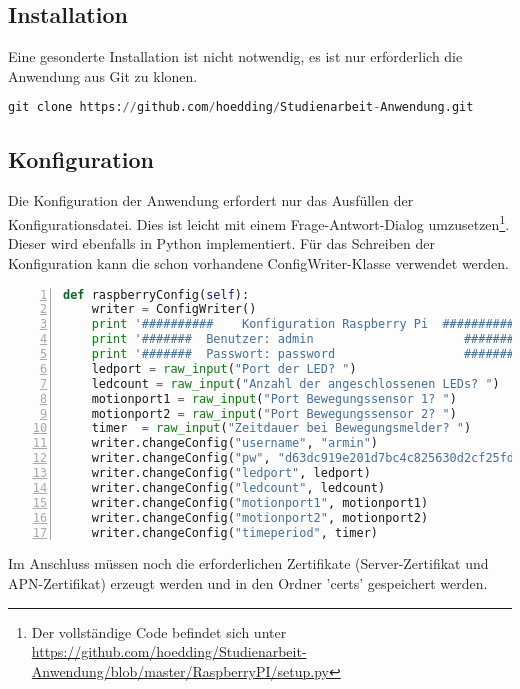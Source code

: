\subsection{Installation}
Eine gesonderte Installation ist nicht notwendig, es ist nur erforderlich die Anwendung aus Git zu klonen. 
\begin{lstlisting}[caption =Git Clone der Studienarbeit, language=python, frame=single, breaklines=true,columns=fullflexible, commentstyle=\color{gray}\upshape, captionpos=b]
git clone https://github.com/hoedding/Studienarbeit-Anwendung.git
\end{lstlisting}

\subsection{Konfiguration}
Die Konfiguration der Anwendung erfordert nur das Ausfüllen der Konfigurationsdatei. Dies ist leicht mit einem Frage-Antwort-Dialog umzusetzen\footnote{Der vollständige Code befindet sich unter \url{https://github.com/hoedding/Studienarbeit-Anwendung/blob/master/RaspberryPI/setup.py}}. Dieser wird ebenfalls in Python implementiert. Für das Schreiben der Konfiguration kann die schon vorhandene ConfigWriter-Klasse verwendet werden. 
\begin{lstlisting}[caption =Implementierung setup.py (Ausschnitt), language=python, frame=single, breaklines=true,columns=fullflexible, commentstyle=\color{gray}\upshape, captionpos=b, numbers = left]
def raspberryConfig(self):
    writer = ConfigWriter()
    print '##########    Konfiguration Raspberry Pi  ###########'
    print '#######  Benutzer: admin                     ########'
    print '#######  Passwort: password                  ########'
    ledport = raw_input("Port der LED? ")
    ledcount = raw_input("Anzahl der angeschlossenen LEDs? ")
    motionport1 = raw_input("Port Bewegungssensor 1? ")
    motionport2 = raw_input("Port Bewegungssensor 2? ")
    timer  = raw_input("Zeitdauer bei Bewegungsmelder? ")
    writer.changeConfig("username", "armin")
    writer.changeConfig("pw", "d63dc919e201d7bc4c825630d2cf25fdc93d4b2f0d46706d29038d01")
    writer.changeConfig("ledport", ledport)
    writer.changeConfig("ledcount", ledcount)
    writer.changeConfig("motionport1", motionport1)
    writer.changeConfig("motionport2", motionport2)
    writer.changeConfig("timeperiod", timer)
\end{lstlisting}
Im Anschluss müssen noch die erforderlichen Zertifikate (Server-Zertifikat und APN-Zertifikat) erzeugt werden und in den Ordner 'certs' gespeichert werden. 
